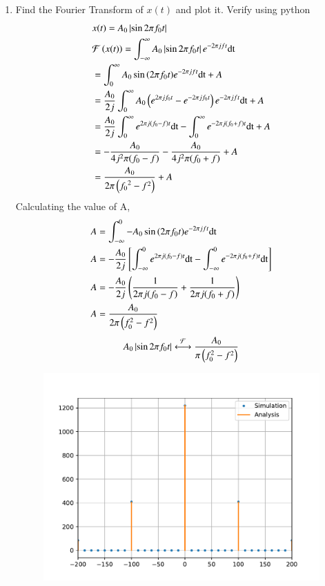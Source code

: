 \documentclass[journal,12pt,twocolumn]{IEEEtran}
\renewcommand\thesection{\arabic{section}}
\begin{document}
\begin{enumerate}[label=\thesection.\arabic*
,ref=\thesection.\theenumi]
\item Find the Fourier Transform of $x(t)$ and plot it. Verify using python \\\solution
\begin{align}
&x(t) = A_0 \left\vert\sin{2 \pi f_0 t}\right\vert \\
&\mathcal{F}\left(x(t)\right) = \int_{-\infty}^{\infty} A_0 \left\vert\sin{2 \pi f_0 t}\right\vert e^{-2 \pi jft} \text{dt} \\
&= \int_{0}^{\infty} A_0 \sin{\ensuremath{\left(2 \pi f_0 t\right)}} e^{-2 \pi jft} \text{dt} + A\\
&= \frac{A_0}{2j} \int_{0}^{\infty} A_0 \left(e^{2 \pi jf_0t} - e^{-2 \pi jf_0t}\right)e^{-2 \pi jft} \text{dt} + A \\
&= \frac{A_0}{2j} \int_{0}^{\infty} e^{2 \pi j (f_0 - f) t} \text{dt} - \int_{0}^{\infty} e^{-2 \pi j (f_0 + f) t} \text{dt} + A \\
&= -\frac{A_0}{4 j^2 \pi (f_0 - f)} - \frac{A_0}{4 j^2 \pi (f_0 + f)} + A \\
&= \frac{A_0}{2 \pi \left({f_0}^2 - f^2\right)} + A
\end{align}
Calculating the value of A, 
\begin{align}
	&A = \int_{-\infty}^{0} -A_0 \sin{\ensuremath{\left(2 \pi f_0 t\right)}} e^{-2 \pi jft} \text{dt} \\
	&A = -\frac{A_0}{2j} \, \Biggl[ \int_{-\infty}^{0} e^{2 \pi j (f_0 - f) t} \text{dt} - \int_{-\infty}^{0} e^{-2 \pi j (f_0 + f) t} \text{dt} \Biggr] \\
	&A = -\frac{A_0}{2j} \, \Biggl( \frac{1}{2 \pi j (f_0 - f)} + \frac{1}{2 \pi j (f_0 + f)} \Biggr) \\
	&A = \frac{A_0}{2 \pi \left(f_{0}^2 - f^2\right)}
\end{align}
\begin{align}
	A_0 \left\vert\sin{2 \pi f_0 t}\right\vert \overset{\mathcal{F}}{ \longleftrightarrow} \frac{A_0}{\pi \left(f_{0}^2 - f^2\right)}
\end{align}
\begin{figure}[!ht]
	\centering
	\includegraphics[width=\columnwidth]{figs/3_8.pdf}
\end{figure}
\vspace{5mm}



\end{enumerate}
\end{document}
